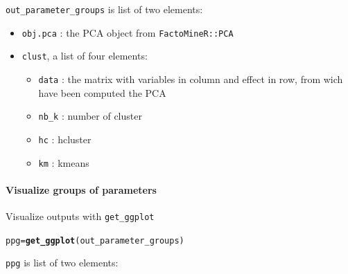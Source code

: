 \documentclass{article}\usepackage[]{graphicx}\usepackage[]{color}
\makeatletter
\newcommand{\hlstd}[1]{\textcolor[rgb]{0.345,0.345,0.345}{#1}}%
\newcommand{\hlkwb}[1]{\textcolor[rgb]{0.69,0.353,0.396}{#1}}%
\newcommand{\hlkwd}[1]{\textcolor[rgb]{0.737,0.353,0.396}{\textbf{#1}}}%
\newenvironment{kframe}{%
 \def\at@end@of@kframe{}%
 \ifinner\ifhmode%
  \def\at@end@of@kframe{\end{minipage}}%
  \begin{minipage}{\columnwidth}%
 \fi\fi%
 \def\FrameCommand##1{\hskip\@totalleftmargin \hskip-\fboxsep
 \colorbox{shadecolor}{##1}\hskip-\fboxsep
     \hskip-\linewidth \hskip-\@totalleftmargin \hskip\columnwidth}%
 \MakeFramed {\advance\hsize-\width
   \@totalleftmargin\z@ \linewidth\hsize
   \@setminipage}}%
 {\par\unskip\endMakeFramed%
 \at@end@of@kframe}
\newenvironment{knitrout}{}{} %
\makeatother
\begin{document}
\texttt{out\_parameter\_groups} is list of two elements:

\begin{itemize}
\item\texttt{obj.pca} : the PCA object from \texttt{FactoMineR::PCA}
\item \texttt{clust}, a list of four elements:
\begin{itemize}
  \item \texttt{data} : the matrix with variables in column and effect in row, from wich have been computed the PCA
  \item \texttt{nb\_k} : number of cluster
  \item \texttt{hc} : hcluster
  \item \texttt{km} : kmeans
  \end{itemize}
\end{itemize}

\paragraph{Visualize groups of parameters}

Visualize outputs with \texttt{get\_ggplot}

\begin{knitrout}
\color{fgcolor}\begin{kframe}
\begin{alltt}
\hlstd{ppg} \hlkwb{=} \hlkwd{get_ggplot}\hlstd{(out_parameter_groups)}
\end{alltt}
\end{kframe}
\end{knitrout}

\texttt{ppg} is list of two elements:
\end{document}
